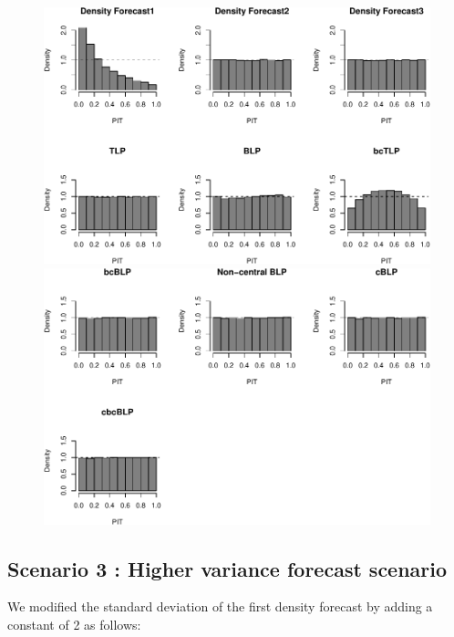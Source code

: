 \documentclass[]{article}
\begin{document}
\begin{figure}[H]

{\centering \includegraphics{Newest_BLPsim_files/figure-latex/unnamed-chunk-9-1} \includegraphics{Newest_BLPsim_files/figure-latex/unnamed-chunk-9-2} 

}

\end{figure}

\hypertarget{scenario-3-higher-variance-forecast-scenario}{%
\subsection{Scenario 3 : Higher variance forecast
scenario}\label{scenario-3-higher-variance-forecast-scenario}}

We modified the standard deviation of the first density forecast by
adding a constant of 2 as follows:
\end{document}
